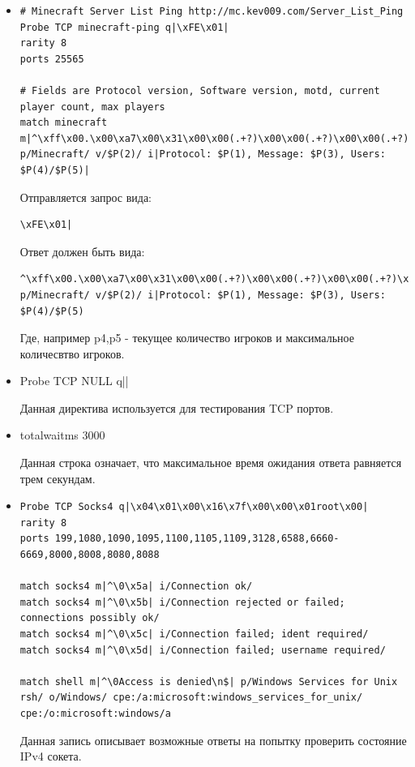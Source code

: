\documentclass[10pt,a4paper]{article}
\begin{document}
\begin{itemize}



\item 
\begin{lstlisting}
# Minecraft Server List Ping http://mc.kev009.com/Server_List_Ping
Probe TCP minecraft-ping q|\xFE\x01|
rarity 8
ports 25565

# Fields are Protocol version, Software version, motd, current player count, max players
match minecraft m|^\xff\x00.\x00\xa7\x00\x31\x00\x00(.+?)\x00\x00(.+?)\x00\x00(.+?)\x00\x00(.+?)\x00\x00(.+)|s p/Minecraft/ v/$P(2)/ i|Protocol: $P(1), Message: $P(3), Users: $P(4)/$P(5)|
\end{lstlisting}

Отправляется запрос вида:
\begin{verbatim}
\xFE\x01|
\end{verbatim}

Ответ должен быть вида:
\begin{lstlisting}
^\xff\x00.\x00\xa7\x00\x31\x00\x00(.+?)\x00\x00(.+?)\x00\x00(.+?)\x00\x00(.+?)\x00\x00(.+)|s p/Minecraft/ v/$P(2)/ i|Protocol: $P(1), Message: $P(3), Users: $P(4)/$P(5)
\end{lstlisting}

Где, например p4,p5 - текущее количество игроков и максимальное количесвтво игроков.

\item Probe TCP NULL q||

Данная директива используется для тестирования TCP портов.

\item totalwaitms 3000

Данная строка означает, что максимальное время ожидания ответа равняется трем секундам.

\item
\begin{lstlisting}
Probe TCP Socks4 q|\x04\x01\x00\x16\x7f\x00\x00\x01root\x00|
rarity 8
ports 199,1080,1090,1095,1100,1105,1109,3128,6588,6660-6669,8000,8008,8080,8088

match socks4 m|^\0\x5a| i/Connection ok/
match socks4 m|^\0\x5b| i/Connection rejected or failed; connections possibly ok/
match socks4 m|^\0\x5c| i/Connection failed; ident required/
match socks4 m|^\0\x5d| i/Connection failed; username required/

match shell m|^\0Access is denied\n$| p/Windows Services for Unix rsh/ o/Windows/ cpe:/a:microsoft:windows_services_for_unix/ cpe:/o:microsoft:windows/a
\end{lstlisting}

Данная запись описывает возможные ответы на попытку проверить состояние IPv4 сокета.

\end{itemize}
\end{document}
